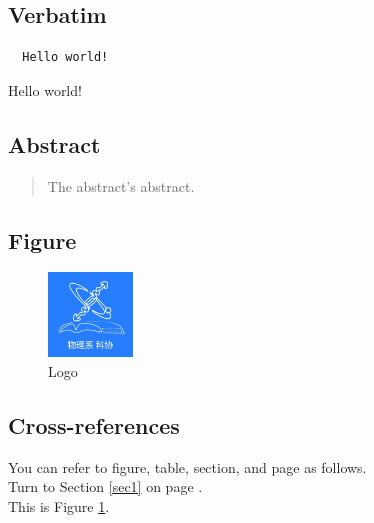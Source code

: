\documentclass[12pt]{article}
\begin{document}
\subsection{Verbatim}
\begin{verbatim}
  Hello world!
\end{verbatim}
Hello world!
\subsection{Abstract}
\begin{abstract}
	The abstract's abstract.\label{abs}
\end{abstract}
\subsection{Figure}
\begin{figure}[!htp]
	\centering
	\includegraphics[width=0.2\textwidth]{logo.jpg}
	\caption{Logo}\label{logo}
\end{figure} %
\subsection{Cross-references}
You can refer to figure, table, section, and page as follows.\\
Turn to Section \ref{sec1} on page \pageref{sec1}.\\
This is Figure \ref{logo}.
\end{document}
